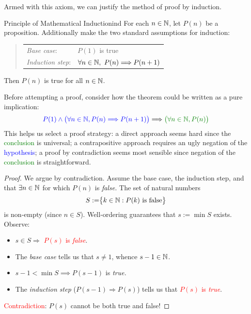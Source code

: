 \goodbreak  

Armed with this axiom, we can justify the method of proof by induction. 

\begin{thm}{Principle of Mathematical Induction}{ind}
	For each $n\in\mathbb{N}$, let $P(n)$ be a proposition. Additionally make the two standard assumptions for induction:
	\begin{quote}
		\begin{tabular}{@{}ll}
			\emph{Base case}: &$P(1)$ is true\\[5pt]
			\emph{Induction step}: &$\forall n\in\mathbb{N},\ P(n)\Longrightarrow P(n+1)$
		\end{tabular}
	\end{quote}
	Then $P(n)$ is true for all $n\in\mathbb{N}$.
\end{thm}

Before attempting a proof, consider how the theorem could be written as a pure implication:
\[
	\textcolor{blue}{P(1)\wedge\bigl(\forall n\in\N,P(n)\Longrightarrow P(n+1)\bigr)}\Longrightarrow \textcolor{Green}{\bigl(\forall n\in\N, P(n)\bigr)}
\]
This helps us select a proof strategy: a direct approach seems hard since the \textcolor{Green}{conclusion} is universal; a contrapositive approach requires an ugly negation of the \textcolor{blue}{hypothesis}; a proof by contradiction seems most sensible since negation of the \textcolor{Green}{conclusion} is straightforward.

\begin{proof}
	We argue by contradiction. Assume the base case, the induction step, and that $\exists n\in\mathbb{N}$ for which $P(n)$ is \emph{false.} The set of natural numbers
	\[
		S:=\bigr\{k\in\mathbb{N}:P(k)\text{ is false}\bigr\}
	\]
	is non-empty (since $n\in S$). Well-ordering guarantees that $s:=\min S$ exists. Observe:
	\begin{itemize}\itemsep0pt\parskip2pt
	  \item $s\in S\Longrightarrow$ \textcolor{red}{$P(s)$ is \emph{false}}.
	  \item The \emph{base case} tells us that $s\neq 1$, whence $s-1\in\mathbb{N}$.
	  \item $s-1<\min S\implies P(s-1)$ is \emph{true.}
	  \item The \emph{induction step} ($P(s-1)\Longrightarrow P(s)$) tells us that \textcolor{red}{$P(s)$ is \emph{true}}.
	\end{itemize}
	\textcolor{red}{Contradiction}: $P(s)$ cannot be both true and false!
\end{proof}


